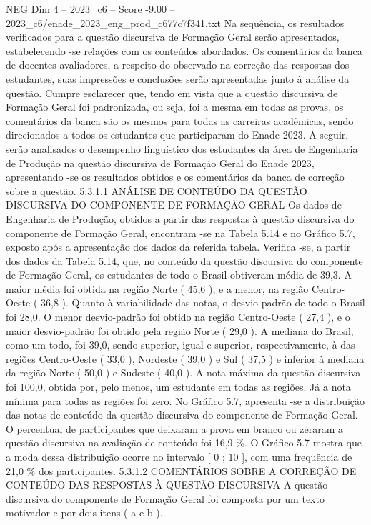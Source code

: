 \begin{textsample}{NEG Dim 4 – 2023\_c6 – Score -9.00 – 2023\_c6/enade\_2023\_eng\_prod\_c677c7f341.txt}
Na sequência, os resultados verificados para a questão discursiva de Formação Geral serão apresentados, estabelecendo -se relações com os conteúdos abordados.
Os comentários da banca de docentes avaliadores, a respeito do observado na correção das respostas dos estudantes, suas impressões e conclusões serão apresentadas junto à análise da questão.
Cumpre esclarecer que, tendo em vista que a questão discursiva de Formação Geral foi padronizada, ou seja, foi a mesma em todas as provas, os comentários da banca são os mesmos para todas as carreiras acadêmicas, sendo direcionados a todos os estudantes que participaram do Enade 2023.
A seguir, serão analisados o desempenho linguístico dos estudantes da área de Engenharia de Produção na questão discursiva de Formação Geral do Enade 2023, apresentando -se os resultados obtidos e os comentários da banca de correção sobre a questão. 5.3.1.1 ANÁLISE DE CONTEÚDO DA QUESTÃO DISCURSIVA DO COMPONENTE DE FORMAÇÃO GERAL Os dados de Engenharia de Produção, obtidos a partir das respostas à questão discursiva do componente de Formação Geral, encontram -se na Tabela 5.14 e no Gráfico 5.7, exposto após a apresentação dos dados da referida tabela.
Verifica -se, a partir dos dados da Tabela 5.14, que, no conteúdo da questão discursiva do componente de Formação Geral, os estudantes de todo o Brasil obtiveram média de 39,3.
A maior média foi obtida na região Norte ( 45,6 ), e a menor, na região Centro-Oeste ( 36,8 ).
Quanto à variabilidade das notas, o desvio-padrão de todo o Brasil foi 28,0.
O menor desvio-padrão foi obtido na região Centro-Oeste ( 27,4 ), e o maior desvio-padrão foi obtido pela região Norte ( 29,0 ).
A mediana do Brasil, como um todo, foi 39,0, sendo superior, igual e superior, respectivamente, à das regiões Centro-Oeste ( 33,0 ), Nordeste ( 39,0 ) e Sul ( 37,5 ) e inferior à mediana da região Norte ( 50,0 ) e Sudeste ( 40,0 ).
A nota máxima da questão discursiva foi 100,0, obtida por, pelo menos, um estudante em todas as regiões.
Já a nota mínima para todas as regiões foi zero.
No Gráfico 5.7, apresenta -se a distribuição das notas de conteúdo da questão discursiva do componente de Formação Geral.
O percentual de participantes que deixaram a prova em branco ou zeraram a questão discursiva na avaliação de conteúdo foi 16,9 \%.
O Gráfico 5.7 mostra que a moda dessa distribuição ocorre no intervalo [ 0 ; 10 ], com uma frequência de 21,0 \% dos participantes. 5.3.1.2 COMENTÁRIOS SOBRE A CORREÇÃO DE CONTEÚDO DAS RESPOSTAS À QUESTÃO DISCURSIVA A questão discursiva do componente de Formação Geral foi composta por um texto motivador e por dois itens ( a e b ).

\end{textsample}
